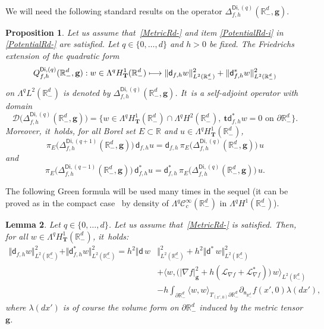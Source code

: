 \documentclass[JEP,XML,SOM,Unicode,NoEqCountersInSection,NoFloatCountersInSection,published]{cedram}
\newcommand\mto{\mathchoice{\longmapsto}{\mapsto}{\mapsto}{\mapsto}}
\newcommand{\mbf}[1]{\mathbf{#1}}
\let\lp\langle
\let\rp\rangle
\let\pa\partial
\theoremstyle{plain}
\newtheorem{proposition}{Proposition}
\newtheorem{lemma}[proposition]{Lemma}
\theoremstyle{definition}
\begin{document}
We will need the following standard results on the operator
$\Delta_{f,h}^{\mathsf{Di},(q)}(\mathbb R^d_-,\mbf g)$.

\begin{proposition}\label{pr.pr1-d}
Let us assume that~\ref{MetricRd-} and item \eqref{PotentialRd-i} in
\ref{PotentialRd-} are satisfied. Let $q\in \{0,\ldots,d\}$
and $h>0$ be fixed. The
Friedrichs extension of the quadratic form
\begin{equation}\label{eq.fried-e}
Q_{f,h}^{\mathsf{Di},(q)}(\mathbb R^d_-,\mbf g): w\in \Lambda^qH^1_{\mbf T}(\mathbb R^d_-)
\mto \Vert \mathsf d_{f,h}w \Vert_{L^2(\mathbb R^d_-)}^2 + \Vert \mathsf d_{f,h}^*w \Vert_{L^2(\mathbb R^d_-)}^2
\end{equation}
on $\Lambda^qL^2(\mathbb R^d_-)$ is denoted by
$\Delta_{f,h}^{\mathsf{Di},(q)}(\mathbb R^d_-,\mbf g)$. It~is a
self-adjoint operator with domain
\[
\mathcal D \bigl(\Delta_{f,h}^{\mathsf{Di},(q)}(\mathbb R^d_-,\mbf
g) \bigr)=\big\{w\in \Lambda^qH^1_{\mbf T}(\mathbb R^d_-)\cap \Lambda^qH^2(\mathbb R^d_-), \ \mbf t \mathsf d_{f,h}^*w=0 \text{ on } \pa \mathbb R^d_-\big\}.
\]
Moreover, it~holds, for all Borel set $E\subset \mathbb R$ and $u\in
\Lambda^qH^1_{\mbf T}(\mathbb R^d_-)$,
\begin{equation}\label{eq.complexe1}
\pi_{E}\bigl(\Delta_{f,h}^{\mathsf{Di},(q+1)}(\mathbb R^d_-,\mbf g)\bigr)\, \mathsf d_{f,h}u=\mathsf d_{f,h}\, \pi_{E}\bigl(\Delta_{f,h}^{\mathsf{Di},(q)}(\mathbb R^d_-,\mbf g)\bigr) \, u
\end{equation}
and
\begin{equation}\label{eq.complexe2}
\pi_{E}\bigl(\Delta_{f,h}^{\mathsf{Di},(q-1)}(\mathbb R^d_-,\mbf g)\bigr)\, \mathsf d_{f,h}^*u=\mathsf d_{f,h}^*\, \pi_{E}\bigl(\Delta_{f,h}^{\mathsf{Di},(q)}(\mathbb R^d_-,\mbf g)\bigr) \, u.
\end{equation}
\end{proposition}

The following Green
formula will be used many times in the sequel (it can be proved as in the compact case~\cite[Lem.\,2.3.2]{helffer-nier-06} by density of $\Lambda^q\mathcal C^\infty_c(\mathbb R^d_-)$ in
$\Lambda^qH^1(\mathbb R^d_-)$).
\begin{lemma}\label{le.Green}
Let $q\in \{0,\ldots,d\}$. Let us assume that~\ref{MetricRd-} is satisfied.
Then, for all $w\in \Lambda^qH^1_{\mbf T}(\mathbb R^d_-)$, it~holds:
\begin{align*}
\Vert \mathsf d_{f,h}w \Vert_{L^2(\mathbb R^d_-)}^2 + \Vert \mathsf d_{f,h}^*w \Vert_{L^2(\mathbb R^d_-)}^2=h^2 \Vert \mathsf d \, w &\Vert_{L^2(\mathbb R^d_-)}^2 + h^2 \Vert \mathsf d^*\, w \Vert_{L^2(\mathbb R^d_-)}^2 \\
&+\big \lp w, \bigl(\vert \nabla f\vert_{\mbf g}^2 +h (\mathcal L_{\nabla f}+\mathcal L_{\nabla f}^*)\bigr)\, w\big \rp_{L^2(\mathbb R^d_-)}\\
& -h\int_{\pa \mathbb R^d_-}\langle w,w\rangle _{T_{(x',0)}\pa \mathbb R^d_-}\partial_{\mathsf n_{\mathbb R^d_-}}f(x',0) \lambda (dx'),
\end{align*}
where $\lambda (dx')$ is of course the volume form on $\pa \mathbb R^d_-$ induced by the metric tensor $\mbf g$.
\end{lemma}
\end{document}
